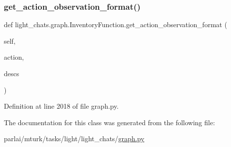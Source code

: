 \subsubsection{\texorpdfstring{get\+\_\+action\+\_\+observation\+\_\+format()}{get\_action\_observation\_format()}}
{\footnotesize\ttfamily def light\+\_\+chats.\+graph.\+Inventory\+Function.\+get\+\_\+action\+\_\+observation\+\_\+format (\begin{DoxyParamCaption}\item[{}]{self,  }\item[{}]{action,  }\item[{}]{descs }\end{DoxyParamCaption})}



Definition at line 2018 of file graph.\+py.



The documentation for this class was generated from the following file\+:\begin{DoxyCompactItemize}
\item 
parlai/mturk/tasks/light/light\+\_\+chats/\hyperlink{parlai_2mturk_2tasks_2light_2light__chats_2graph_8py}{graph.\+py}\end{DoxyCompactItemize}

